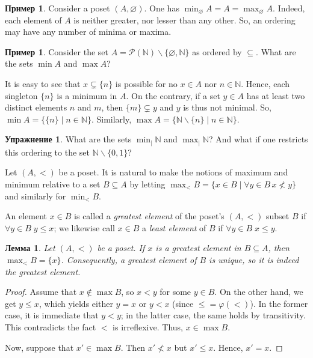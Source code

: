 \documentclass[12pt,notitlepage]{article}
\theoremstyle{plain}
\newtheorem{lemma}[thm]{Лемма}
\theoremstyle{definition}
\newtheorem{exc}[thm]{Упражнение}
\newtheorem{exm}[thm]{Пример}
\newtheorem{rem}[thm]{Замечание}
\theoremstyle{plain}
\newcommand{\N}{\mathbb{N}}
\newcommand{\sbs}{\subseteq}
\renewcommand{\setminus}{\smallsetminus}
\newcommand{\void}{\varnothing}
\newcommand{\mP}{\mathcal{P}}
\renewcommand{\phi}{\varphi}
\newcommand{\id}{\mathrm{id}}
\newcommand{\1}{\mathbf{1}}
\newcommand{\0}{\mathbf{0}}
\newcommand{\dvd}{\mathop{\mid}}
\begin{document}
\begin{exm}
	Consider a poset $(A, \void)$. One has $\min_{\void} A = A = \max_{\void} A$. Indeed, each element of $A$ is neither greater, nor lesser than any other. So, an ordering may have any number of minima or maxima.
\end{exm}

\begin{exm}
	Consider the set $A = \mP(\N) \setminus \{\void, \N\}$ as ordered by ${\sbs}$. What are the sets $\min A$ and $\max A$?
	
	It is easy to see that $x \subsetneq \{n\}$ is possible for no $x \in A$ nor $n \in \N$. Hence, each singleton $\{n\}$ is a minimum in $A$. On the contrary, if a set $y \in A$ has at least two distinct elements $n$ and $m$, then $\{m\} \subsetneq y$ and $y$ is thus not minimal. So, $\min A = \{ \{ n \} \mid n \in \N\}$. Similarly, $\max A = \{ \N \setminus \{ n \} \mid n \in \N\}$.
\end{exm} 

\begin{exc}
	What are the sets $\min_{\dvd} \N$ and $\max_{\dvd} \N$? And what if one restricts this ordering to the set $\N \setminus \{0,1\}$?
\end{exc}

Let $(A, <)$ be a poset. It is natural to make the notions of maximum and minimum relative to a set $B \sbs A$ by letting $\max_{<} B = \{ x \in B \mid \forall y \in B\, x \nless y \}$ and similarly for $\min_{<} B$.
%

An element $x \in B$ is called a \emph{greatest element} of the poset's $(A, <)$ subset $B$ if $\forall y \in B\; y \leq x$; we likewise call $x \in B$ a \emph{least element} of $B$ if $\forall y \in B\; x \leq y$.

\begin{lemma}
	Let $(A, <)$ be a poset. If $x$ is a greatest element in $B \sbs A$, then $\max_{<} B = \{x\}$. Consequently, a greatest element of $B$ is unique, so it is indeed \emph{the} greatest element.
\end{lemma}
\begin{proof}
	Assume that $x \notin \max B$, so $x < y$ for some $y \in B$. On the other hand, we get $y \leq x$, which yields either $y = x$ or $y < x$ (since ${\leq} = \phi({<})$). In the former case, it is immediate that $y < y$; in the latter case, the same holds by transitivity. This contradicts the fact ${<}$ is irreflexive. Thus, $x \in \max B$.
	
	Now, suppose that $x' \in \max B$. Then $x' \nless x$ but $x' \leq x$. Hence, $x' = x$.
\end{proof}
\end{document}

